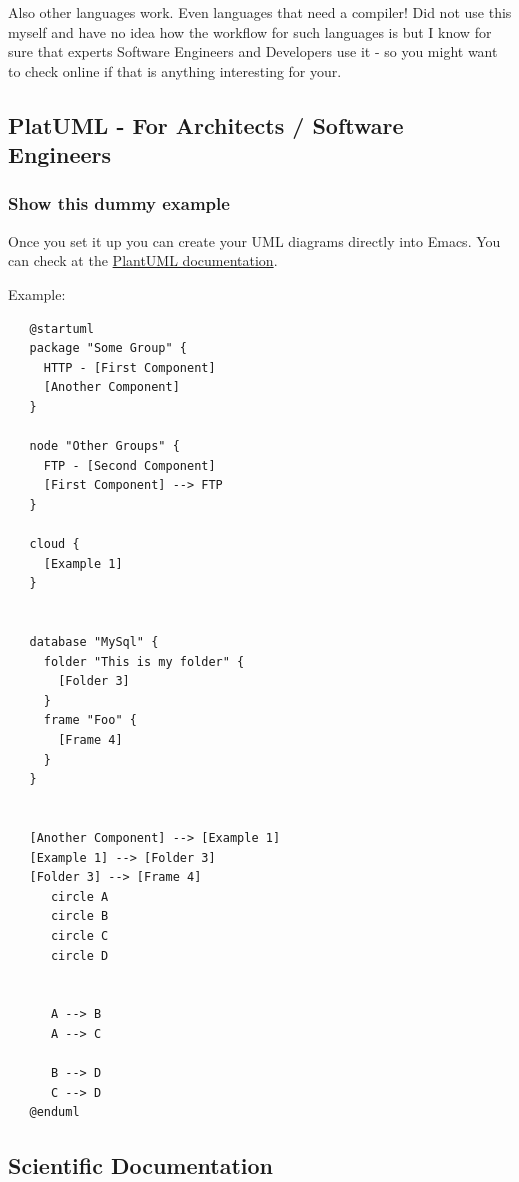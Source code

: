 \documentclass[a4paper]{article}
\begin{document}
Also other languages work. Even languages that need a compiler!
Did not use this myself and have no idea how the workflow for such
languages is but I know for sure that experts Software Engineers
and Developers use it - so you might want to check online if that
is anything interesting for your.



\subsection{PlatUML - For Architects / Software Engineers}
\label{sec:org51945cb}

\subsubsection{Show this dummy example}
\label{sec:orgbc6e6a5}

Once you set it up you can create your UML diagrams directly into
Emacs. You can check at the \href{https://plantuml.com/de/}{PlantUML documentation}.

Example:

\begin{verbatim}
   @startuml
   package "Some Group" {
     HTTP - [First Component]
     [Another Component]
   }

   node "Other Groups" {
     FTP - [Second Component]
     [First Component] --> FTP
   }

   cloud {
     [Example 1]
   }


   database "MySql" {
     folder "This is my folder" {
       [Folder 3]
     }
     frame "Foo" {
       [Frame 4]
     }
   }


   [Another Component] --> [Example 1]
   [Example 1] --> [Folder 3]
   [Folder 3] --> [Frame 4]
      circle A
      circle B
      circle C
      circle D


      A --> B
      A --> C

      B --> D
      C --> D
   @enduml
\end{verbatim}

\begin{center}

\end{center}


\subsection{Scientific Documentation}
\label{sec:orge02bc25}
\end{document}
